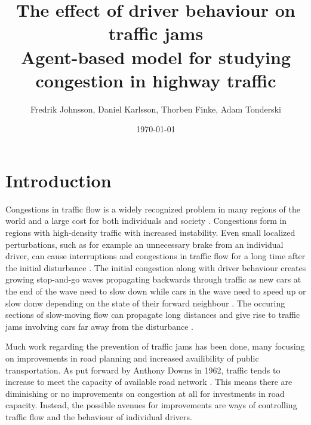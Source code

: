 \documentclass[11pt,a4paper,twocolumn]{article}
\begin{document}
\title{%
  The effect of driver behaviour on traffic jams \\
  \large Agent-based model for studying congestion in highway traffic}
\author{Fredrik Johnsson, Daniel Karlsson, Thorben Finke, Adam Tonderski}
\date{\today}

\twocolumn[
  \begin{@twocolumnfalse}
    \maketitle
    \begin{abstract}
        \noindent
    \end{abstract}
  \end{@twocolumnfalse}
]

\newpage
\tableofcontents

\section{Introduction}
Congestions in traffic flow is a widely recognized problem in many regions of the world and a large cost for both individuals and society \cite{inrix}. Congestions form in regions with high-density traffic with increased instability. Even small localized perturbations, such as for example an unnecessary brake from an individual driver, can cause interruptions and congestions in traffic flow for a long time after the initial disturbance \cite{kerner97flow, bando1995dynamical}. The initial congestion along with driver behaviour creates growing stop-and-go waves propagating backwards through traffic as new cars at the end of the wave need to slow down while cars in the wave need to speed up or slow donw depending on the state of their forward neighbour  \cite{stern17autonomous, kerner96trafficjam}. The occuring sections of slow-moving flow can propagate long distances and give rise to traffic jams involving cars far away from the disturbance \cite{kerner96trafficjam}.

Much work regarding the prevention of traffic jams has been done, many focusing on improvements in road planning and increased availibility of public transportation. As put forward by Anthony Downs in 1962, traffic tends to increase to meet the capacity of available road network \cite{downs2000stuck, downs2005still, downs1962law}. This means there are diminishing or no improvements on congestion at all for investments in road capacity. Instead, the possible avenues for improvements are ways of controlling traffic flow and the behaviour of individual drivers.
\end{document}
